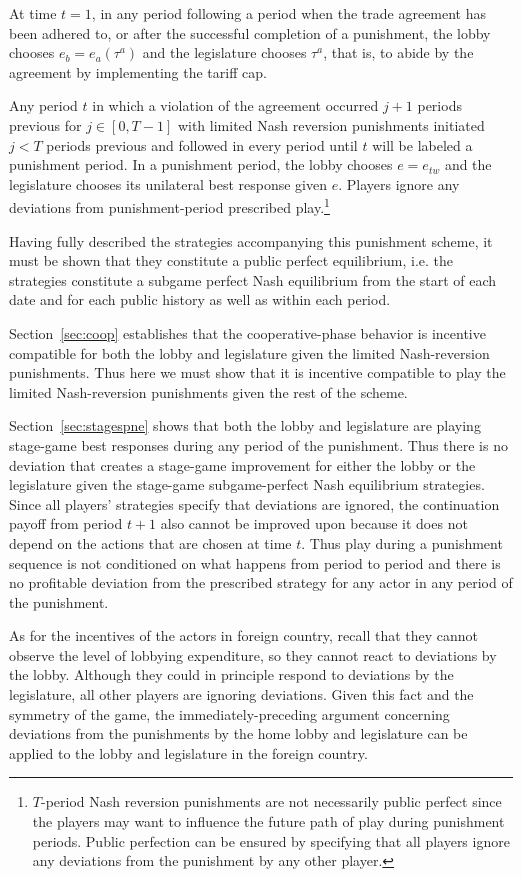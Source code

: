 \documentclass[authoryear, review]{elsarticle}
\begin{document}
At time $t=1$, in any period following a period when the trade agreement has been adhered to, or after the successful completion of a punishment, the lobby chooses $e_b =e_a(\tau^a)$ and the legislature chooses $\tau^a$, that is, to abide by the agreement by implementing the tariff cap.

Any period $t$ in which a violation of the agreement occurred $j+1$ periods previous for $j \in [0,T-1]$ with limited Nash reversion punishments initiated $j<T$ periods previous and followed in every period until $t$ will be labeled a punishment period. In a punishment period, the lobby chooses $e = e_{tw}$ and the legislature chooses its unilateral best response given $e$. Players ignore any deviations from punishment-period prescribed play.\footnote{$T$-period Nash reversion punishments are not necessarily public perfect since the players may want to influence the future path of play during punishment periods. Public perfection can be ensured by specifying that all players ignore any deviations from the punishment by any other player.}

Having fully described the strategies accompanying this punishment scheme, it must be shown that they constitute a public perfect equilibrium, i.e. the strategies constitute a subgame perfect Nash equilibrium from the start of each date and for each public history as well as within each period.
		
Section~\ref{sec:coop} establishes that the cooperative-phase behavior is incentive compatible for both the lobby and legislature given the limited Nash-reversion punishments. Thus here we must show that it is incentive compatible to play the limited Nash-reversion punishments given the rest of the scheme.

Section~\ref{sec:stagespne} shows that both the lobby and legislature are playing stage-game best responses during any period of the punishment. Thus there is no deviation that creates a stage-game improvement for either the lobby or the legislature given the stage-game subgame-perfect Nash equilibrium strategies. Since all players' strategies specify that deviations are ignored, the continuation payoff from period $t+1$ also cannot be improved upon because it does not depend on the actions that are chosen at time $t$. Thus play during a punishment sequence is not conditioned on what happens from period to period and there is no profitable deviation from the prescribed strategy for any actor in any period of the punishment.

As for the incentives of the actors in foreign country, recall that they cannot observe the level of lobbying expenditure, so they cannot react to deviations by the lobby. Although they could in principle respond to deviations by the legislature, all other players are ignoring deviations. Given this fact and the symmetry of the game, the immediately-preceding argument concerning deviations from the punishments by the home lobby and legislature can be applied to the lobby and legislature in the foreign country.
\end{document}
